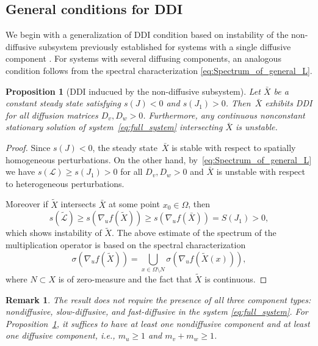 \documentclass[12pt, a4paper]{amsart}
\numberwithin{equation}{section}
\newcommand{\CSS}{\bar{X}}
\newcommand{\NSS}{\tilde{X}}
\newcommand{\un}{u}
\newcommand{\Ds}{D_v}
\newcommand{\Df}{D_w}
\newcommand{\mn}{m_{u}}  %
\newcommand{\ms}{m_{v}}  %
\newcommand{\mfa}{m_{w}} %
\newcommand{\fn}{f}
\renewcommand{\L}{{\mathcal{L}}}
\newtheorem{proposition}[theorem]{\bf Proposition}
\newtheorem{remark}[theorem]{\bf Remark}
\begin{document}
\subsection{General conditions for DDI}\label{sec:DDI_general_conditions}
We begin with a generalization of DDI condition based on instability of the non-diffusive subsystem previously established for systems with a single diffusive component  \cite{Cygan2022}. For systems with several diffusing components, an analogous condition follows from the spectral characterization \eqref{eq:Spectrum_of_general_L}.

\begin{proposition}[DDI inducued by the non-diffusive subsystem]\label{prop:DDI_autocatalysis}
Let $\CSS$ be a constant steady state satisfying $s(J) < 0$ and $s(J_1) > 0$. 
Then~$\CSS$ exhibits DDI for all diffusion matrices $\Ds, \Df > 0$. 
Furthermore, any continuous nonconstant stationary solution of system~\eqref{eq:full_system} intersecting $\CSS$ is unstable.
\end{proposition}

\begin{proof}
Since $s(J) < 0$, the steady state~$\CSS$ is stable with respect to spatially homogeneous perturbations. 
On the other hand, by~\eqref{eq:Spectrum_of_general_L} we have
$
s(\L) \geqslant s(J_1) > 0
$
for all $\Ds, \Df > 0$ and $\CSS$ is unstable with respect to heterogeneous perturbations.

Moreover if $\NSS$ intersects $\CSS$ at some point $x_0 \in \Omega$, then
\[
s(\tilde{\L}) \geqslant s(\nabla_{\un}\fn(\NSS)) \geqslant s(\nabla_{\un}\fn(\CSS)) = S(J_1) > 0,
\]
which shows instability of $\NSS$.
The above estimate of the spectrum of the multiplication operator is based on the spectral characterization
\[
\sigma\left( \nabla_{\un}\fn(\NSS)\right) = \bigcup_{x\in\Omega\setminus N} \sigma \left( \nabla_{\un}\fn(\NSS(x))\right),
\]
where $N\subset X$ is of zero-measure \cite{KMMü23} and the fact that $\NSS$ is continuous.
\end{proof}

\begin{remark}
The result does not require the presence of all three component types: nondiffusive, slow-diffusive, and fast-diffusive in the system \eqref{eq:full_system}. 
For Proposition~\ref{prop:DDI_autocatalysis}, it suffices to have at least one nondiffusive component and at least one diffusive component, i.e., $\mn \geq 1$ and $\ms + \mfa \geq 1$.
\end{remark}
\end{document}
